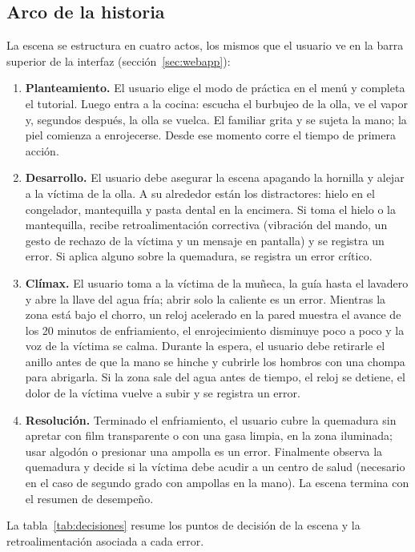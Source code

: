\documentclass[11pt,letterpaper]{article}
\begin{document}
\subsection{Arco de la historia}

La escena se estructura en cuatro actos, los mismos que el usuario ve en la barra superior de la interfaz (sección~\ref{sec:webapp}):

\begin{enumerate}[leftmargin=2em, itemsep=2pt]
  \item \textbf{Planteamiento.} El usuario elige el modo de práctica en el menú y completa el tutorial. Luego entra a la cocina: escucha el burbujeo de la olla, ve el vapor y, segundos después, la olla se vuelca. El familiar grita y se sujeta la mano; la piel comienza a enrojecerse. Desde ese momento corre el tiempo de primera acción.
  \item \textbf{Desarrollo.} El usuario debe asegurar la escena apagando la hornilla y alejar a la víctima de la olla. A su alrededor están los distractores: hielo en el congelador, mantequilla y pasta dental en la encimera. Si toma el hielo o la mantequilla, recibe retroalimentación correctiva (vibración del mando, un gesto de rechazo de la víctima y un mensaje en pantalla) y se registra un error. Si aplica alguno sobre la quemadura, se registra un error crítico.
  \item \textbf{Clímax.} El usuario toma a la víctima de la muñeca, la guía hasta el lavadero y abre la llave del agua fría; abrir solo la caliente es un error. Mientras la zona está bajo el chorro, un reloj acelerado en la pared muestra el avance de los 20 minutos de enfriamiento, el enrojecimiento disminuye poco a poco y la voz de la víctima se calma. Durante la espera, el usuario debe retirarle el anillo antes de que la mano se hinche y cubrirle los hombros con una chompa para abrigarla. Si la zona sale del agua antes de tiempo, el reloj se detiene, el dolor de la víctima vuelve a subir y se registra un error.
  \item \textbf{Resolución.} Terminado el enfriamiento, el usuario cubre la quemadura sin apretar con film transparente o con una gasa limpia, en la zona iluminada; usar algodón o presionar una ampolla es un error. Finalmente observa la quemadura y decide si la víctima debe acudir a un centro de salud (necesario en el caso de segundo grado con ampollas en la mano). La escena termina con el resumen de desempeño.
\end{enumerate}

La tabla~\ref{tab:decisiones} resume los puntos de decisión de la escena y la retroalimentación asociada a cada error.
\end{document}
